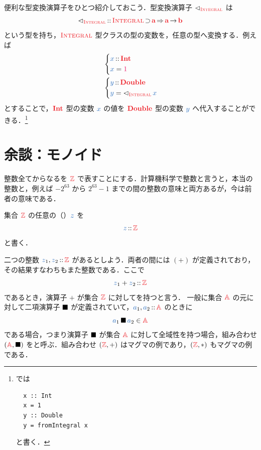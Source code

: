 \documentclass[a5paper,twoside,fleqn,draft]{jsbook}
\begin{document}
便利な型変換演算子をひとつ紹介しておこう．型変換演算子
$\hFromIntegral$ は
\begin{equation}
  \hFromIntegral
  \hIsTypeOf{}\hIntegral\hHasElementsOf\hTypeName{a}
  \hAndThen\hTypeName{a}\hFunctionArrow\hTypeName{b}
\end{equation}
という型を持ち，$\hIntegral$ 型クラスの型の変数を，任意の型へ変換する．例えば
\begin{align}
  {}
  &\left\{
  \begin{aligned}
    \hVar{x}
    &\hIsTypeOf\hInt\\
    \hVar{x}
    &=\hConstant{1}
  \end{aligned}
  \right.\\
    {}
    &\left\{
    \begin{aligned}
      \hVar{y}
      &\hIsTypeOf\hDouble\\
      \hVar{y}
      &=\hFromIntegral\hVar{x}
    \end{aligned}
  \right.
\end{align}
とすることで，$\hInt$ 型の変数 $\hVar{x}$ の値を $\hDouble$ 型の変数 $\hVar{y}$ へ代入することができる．\footnote{\haskell では
\begin{verbatim}
  x :: Int
  x = 1
  y :: Double
  y = fromIntegral x
\end{verbatim}
と書く．}

\separator


\section{余談：モノイド}

整数全てからなるを $\hSet{Z}$ で表すことにする．計算機科学で整数と言うと，本当の整数と，例えば $-2^{63}$ から $2^{63}-1$ までの間の整数の意味と両方あるが，今は前者の意味である．

集合 $\hSet{Z}$ の任意の（）$\hVar{z}$ を
\begin{equation}
  \hVar{z}
  \hIsTypeOf\hSet{Z}
\end{equation}
と書く．

二つの整数 $\hVar{z}_1,\hVar{z}_2\hIsTypeOf\hSet{Z}$ があるとしよう．両者の間には $(+)$ が定義されており，その結果すなわちもまた整数である．ここで
\begin{equation}
  \hVar{z}_1+\hVar{z}_2
  \hIsTypeOf\hSet{Z}
\end{equation}
であるとき，演算子 $+$ が集合 $\hSet{Z}$ に対してを持つと言う．
一般に集合 $\hSet{A}$ の元に対して二項演算子 $\operatorname{\blacksquare}$ が定義されていて，$\hVar{a}_1,\hVar{a}_2\hIsTypeOf\hSet{A}$ のときに
\begin{equation}
  \label{eq:totality}
  \hVar{a}_1\hAnyBinOp \hVar{a}_2
  \in\hSet{A}
\end{equation}
である場合，つまり演算子 $\operatorname{\blacksquare}$ が集合 $\hSet{A}$ に対して全域性を持つ場合，組み合わせ $(\hSet{A},\hAnyBinOp)$ をと呼ぶ．組み合わせ $(\hSet{Z},+)$ はマグマの例であり，$(\hSet{Z},*)$ もマグマの例である．
\end{document}
